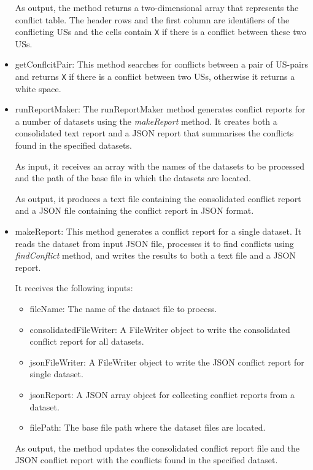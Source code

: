 \begin{itemize}
	As output, the method returns a two-dimensional array that represents the conflict table. The header rows and the first column are identifiers of the conflicting USs and the cells contain \texttt{X} if there is a conflict between these two USs.
	
	\item getConflcitPair: This method searches for conflicts between a pair of US-pairs and returns \texttt{X} if there is a conflict between two USs, otherwise it returns a white space.
	
	\item runReportMaker: The runReportMaker method generates conflict reports for a number of datasets using the \textit{makeReport} method. It creates both a consolidated text report and a JSON report that summarises the conflicts found in the specified datasets.
	
	As input, it receives an array with the names of the datasets to be processed and the path of the base file in which the datasets are located.
	
	As output, it produces a text file containing the consolidated conflict report and a JSON file containing the conflict report in JSON format.
	
	\item makeReport: This method generates a conflict report for a single dataset. It reads the dataset from input JSON file, processes it to find conflicts using \textit{findConflict} method, and writes the results to both a text file and a JSON report.
	
	It receives the following inputs:
	\begin{itemize}
		\item fileName: The name of the dataset file to process.
		
		\item consolidatedFileWriter: A FileWriter object to write the consolidated conflict report for all datasets.
		
		\item jsonFileWriter: A FileWriter object to write the JSON conflict report for single dataset.
		
		\item jsonReport: A JSON array object for collecting conflict reports from a dataset.
		
		\item filePath: The base file path where the dataset files are located.
		
	\end{itemize}
	As output, the method updates the consolidated conflict report file and the JSON conflict report with the conflicts found in the specified dataset.
	

\end{itemize}

